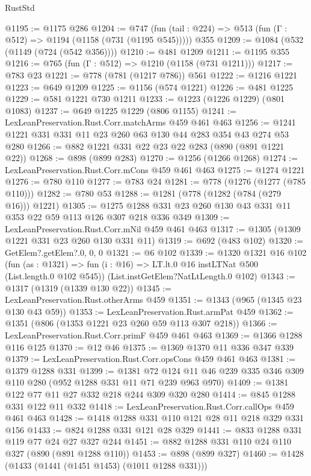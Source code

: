 \begin{lexlean}{RustStd}
\begin{coremodule}
{\begin{coremodule}
{{{{{{{@1195 := @1175 @286
@1204 := @747 (fun (tail : @224) => @513 (fun (Γ : @512) => @1194 (@1158 (@731 (@1195 @545))))) @355
@1209 := @1084 (@532 (@1149 (@724 (@542 @356))))
@1210 := @481 @1209
@1211 := @1195 @355
@1216 := @765 (fun (Γ : @512) => @1210 (@1158 (@731 @1211)))
@1217 := @783 @23
@1221 := @778 (@781 (@1217 @786)) @561
@1222 := @1216 @1221
@1223 := @649 @1209
@1225 := @1156 (@574 @1221)
@1226 := @481 @1225
@1229 := @581 @1221 @730 @1211
@1233 := @1223 (@1226 @1229) (@801 @1083)
@1237 := @649 @1225 @1229 (@806 @1155)
@1241 := LexLeanPreservation.Rust.Corr.matchArms @459 @461 @463
@1256 := @1241 @1221 @331 @331 @11 @23 @260 @63 @130 @44 @283 @354 @43 @274 @53 @280
@1266 := @882 @1221 @331 @22 @23 @22 @283 (@890 (@891 @1221 @22))
@1268 := @898 (@899 @283)
@1270 := @1256 (@1266 @1268)
@1274 := LexLeanPreservation.Rust.Corr.mCons @459 @461 @463
@1275 := @1274 @1221
@1276 := @780 @110
@1277 := @783 @24
@1281 := @778 (@1276 (@1277 (@785 @110)))
@1282 := @780 @53
@1288 := @1281 (@778 (@1282 (@784 (@279 @16))) @1221)
@1305 := @1275 @1288 @331 @23 @260 @130 @43 @331 @11 @353 @22 @59 @113 @126 @307 @218 @336 @349
@1309 := LexLeanPreservation.Rust.Corr.mNil @459 @461 @463
@1317 := @1305 (@1309 @1221 @331 @23 @260 @130 @331 @11)
@1319 := @692 (@483 @102)
@1320 := GetElem?.getElem?.{0, 0, 0}
@1321 := @6 @102
@1339 := @1320
    @1321
    @16
    @102
    (fun (as : @1321) => fun (i : @16) => LT.lt.{0} @16 instLTNat @500 (List.length.{0} @102 @545))
    (List.instGetElem?NatLtLength.{0} @102)
@1343 := @1317 (@1319 (@1339 @130 @22))
@1345 := LexLeanPreservation.Rust.otherArms @459
@1351 := @1343 (@965 (@1345 @23 @130 @43 @59))
@1353 := LexLeanPreservation.Rust.armPat @459
@1362 := @1351 (@806 (@1353 @1221 @23 @260 @59 @113 @307 @218))
@1366 := LexLeanPreservation.Rust.Corr.primF @459 @461 @463
@1369 := @1366 @1288 @116 @125
@1370 := @12 @46
@1375 := @1369 @1370 @11 @336 @347 @339
@1379 := LexLeanPreservation.Rust.Corr.opsCons @459 @461 @463
@1381 := @1379 @1288 @331
@1399 := @1381
    @72
    @124
    @11
    @46
    @239
    @335
    @346
    @309
    @110
    @280
    (@952 @1288 @331 @11 @71 @239 @963 @970)
@1409 := @1381 @122 @77 @11 @27 @332 @218 @244 @309 @320 @280
@1414 := @845 @1288 @331 @122 @11 @332
@1418 := LexLeanPreservation.Rust.Corr.callOps @459 @461 @463
@1428 := @1418 @1288 @331 @110 @121 @28 @11 @218 @329 @331 @156
@1433 := @824 @1288 @331 @121 @28 @329
@1441 := @833 @1288 @331 @119 @77 @24 @27 @327 @244
@1451 := @882 @1288 @331 @110 @24 @110 @327 (@890 (@891 @1288 @110))
@1453 := @898 (@899 @327)
@1460 := @1428 (@1433 (@1441 (@1451 @1453) (@1011 @1288 @331)))
}}}}}}}
\end{coremodule}}
\end{coremodule}
\end{lexlean}
